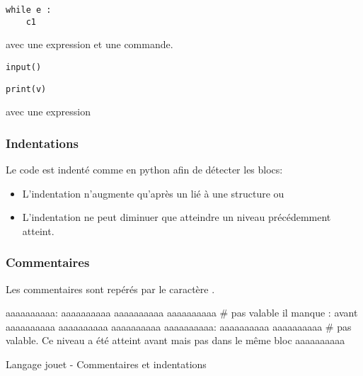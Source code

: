 \begin{minipage}[c]{0.38\textwidth}
\begin{verbatim}
while e :
	c1
\end{verbatim}
\end{minipage}
\hspace{1cm}
\begin{minipage}[c]{0.38\textwidth}
	avec  une expression et  une commande.	
\end{minipage}
\vspace{0.5cm}

\begin{minipage}[c]{0.38\textwidth}
\begin{verbatim}
input()
\end{verbatim}
\end{minipage}
\vspace{0.5cm}

\begin{minipage}[c]{0.38\textwidth}
\begin{verbatim}
print(v)
\end{verbatim}
\end{minipage}
\hfill
\begin{minipage}[c]{0.38\textwidth}
	avec  une expression	
\end{minipage}

\subsubsection{Indentations}
Le code est indenté comme en python afin de détecter les blocs:
\begin{itemize}
	\item L'indentation n'augmente qu'après un \pyinline{:} lié à une structure  ou 
	\item L'indentation ne peut diminuer que atteindre un niveau précédemment atteint.
\end{itemize}

\subsubsection{Commentaires}
Les commentaires sont repérés par le caractère \pyinline{#} .

\begin{lstfloat}
	\begin{center}
	\begin{pythonlst}
aaaaaaaaaa:
	aaaaaaaaaa
	aaaaaaaaaa
		aaaaaaaaaa # pas valable il manque : avant
		aaaaaaaaaa
	aaaaaaaaaa
aaaaaaaaaa
aaaaaaaaaa:
			aaaaaaaaaa
	aaaaaaaaaa # pas valable. Ce niveau a été atteint avant mais pas dans le même bloc
aaaaaaaaaa
\end{pythonlst}
\caption{Langage jouet - Commentaires et indentations}
\end{center}
\end{lstfloat}



